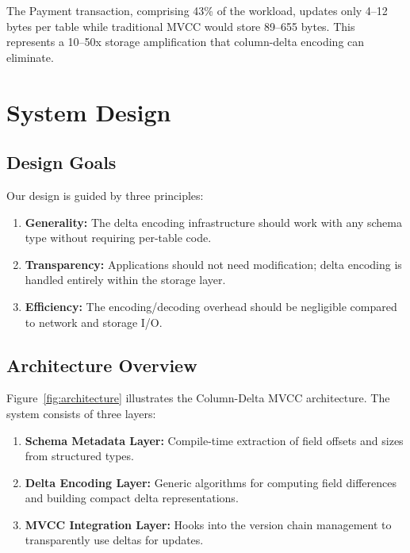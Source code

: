 \documentclass[letterpaper,twocolumn,10pt]{article}
\begin{document}
The Payment transaction, comprising 43\% of the workload, updates only 4--12 bytes per table while traditional MVCC would store 89--655 bytes. This represents a 10--50x storage amplification that column-delta encoding can eliminate.

\section{System Design}
\label{sec:design}

\subsection{Design Goals}

Our design is guided by three principles:

\begin{enumerate}
\item \textbf{Generality:} The delta encoding infrastructure should work with any schema type without requiring per-table code.

\item \textbf{Transparency:} Applications should not need modification; delta encoding is handled entirely within the storage layer.

\item \textbf{Efficiency:} The encoding/decoding overhead should be negligible compared to network and storage I/O.
\end{enumerate}

\subsection{Architecture Overview}

Figure~\ref{fig:architecture} illustrates the Column-Delta MVCC architecture. The system consists of three layers:

\begin{enumerate}
\item \textbf{Schema Metadata Layer:} Compile-time extraction of field offsets and sizes from structured types.

\item \textbf{Delta Encoding Layer:} Generic algorithms for computing field differences and building compact delta representations.

\item \textbf{MVCC Integration Layer:} Hooks into the version chain management to transparently use deltas for updates.
\end{enumerate}
\end{document}
